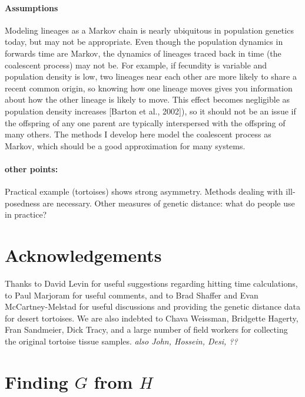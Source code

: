 \documentclass{article}
\newcommand{\plr}[1]{{\em \color{blue} #1}}
\begin{document}
\paragraph{Assumptions}
Modeling lineages as a Markov chain is nearly ubiquitous in population genetics today,
but may not be appropriate.
Even though the population dynamics in forwards time are Markov, the dynamics of lineages traced back
in time (the coalescent process) may not be. For example, if fecundity is variable and population density
is low, two lineages near each other are more likely to share a recent common origin, so knowing how one
lineage moves gives you information about how the other lineage is likely to move. This effect becomes
negligible as population density increases [Barton et al., 2002]), so it should not be an issue if the offspring
of any one parent are typically interspersed with the offspring of many others. The methods I develop here
model the coalescent process as Markov, which should be a good approximation for many systems.

\paragraph{other points:}
Practical example (tortoises) shows strong asymmetry.
Methods dealing with ill-posedness are necessary.
Other measures of genetic distance: what do people use in practice?


\section*{Acknowledgements}

Thanks to David Levin for useful suggestions regarding hitting time calculations,
to Paul Marjoram for useful comments,
and to Brad Shaffer and Evan McCartney-Melstad for useful discussions
and providing the genetic distance data for desert tortoises.
We are also indebted to Chava Weissman, Bridgette Hagerty, Fran Sandmeier, Dick Tracy,
and a large number of field workers for collecting the original tortoise tissue samples.
\plr{also John, Hossein, Desi, ??}




\appendix
\renewcommand{\thefigure}{S\arabic{figure}}
\setcounter{figure}{0}


\section{Finding $G$ from $H$}
\label{apx::hitting_calcs}
\end{document}
